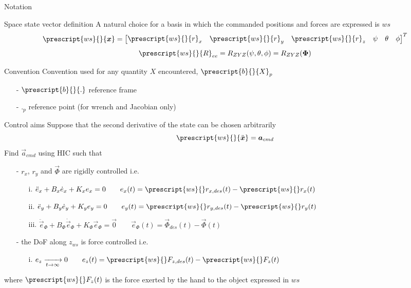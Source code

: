 \begin{frame}{Notation}
  \begin{block}{Space state vector definition}
    A natural choice for a basis in which the commanded positions and forces are expressed is $ws$
    \[
    \prescript{ws}{}{\vec{x}} = 
    \begin{bmatrix}
      \prescript{ws}{}{r}_x & \prescript{ws}{}{r}_y & \prescript{ws}{}{r}_z & \psi & \theta & \phi
    \end{bmatrix}^T
    \]
    \[
    \prescript{ws}{}{R}_{ee} = R_{ZYZ}(\psi, \theta, \phi) = R_{ZYZ}(\vec{\Phi})
    \]
  \end{block}
  \begin{block}{Convention}
    Convention used for any quantity $X$ encountered, $\prescript{b}{}{X}_p$
    \begin{itemize}
      \item[-] $\prescript{b}{}{.}$ reference frame
      \item[-] $._p$ reference point (for wrench and Jacobian only)
    \end{itemize}
  \end{block}
\end{frame}

\begin{frame}{Control aims}
  Suppose that the second derivative of the state can be chosen arbitrarily
  \[
  \prescript{ws}{}{\ddot{\vec{x}}} = \vec{a}_{cmd}
  \]
  Find $\vec{a}_{cmd}$ using HIC such that
  \begin{itemize}
  \item[-]$r_x$, $r_y$ and $\vec{\Phi}$ are rigidly controlled i.e.
    \begin{itemize}
    \item[i.] $\ddot{e}_{x} + B_x \dot{e}_x + K_x e_x = 0 \quad \quad  e_x(t) =   \prescript{ws}{} r_{x,des}(t) - \prescript{ws}{} r_{x}(t)$
    \item[ii.] $\ddot{e}_{y} + B_y \dot{e}_y + K_y e_y = 0 \quad \quad e_y(t) =   \prescript{ws}{} r_{y,des}(t) - \prescript{ws}{} r_{y}(t)$
    \item[iii.] $\ddot{\vec{e}}_{\Phi} + B_{\Phi} \dot{\vec{e}}_{\Phi} + K_{\Phi} \vec{e}_{\Phi} = \vec{0} \quad \quad \vec{e}_{\Phi}(t) = \vec{\Phi}_{des}(t) - \vec{\Phi}(t)$
    \end{itemize}
  \item[-]the DoF along $z_{ws}$ is force controlled i.e.
    \begin{itemize}
    \item[i.] $e_z \xrightarrow[t \to \infty] {} 0 \quad \quad e_{z}(t) = \prescript{ws}{} F_{z,des}(t) - \prescript{ws}{} F_{z}(t)$
    \end{itemize}
  \end{itemize}
  where $\prescript{ws}{} F_{z}(t)$ is the force exerted by the hand to the object expressed in $ws$
\end{frame}

